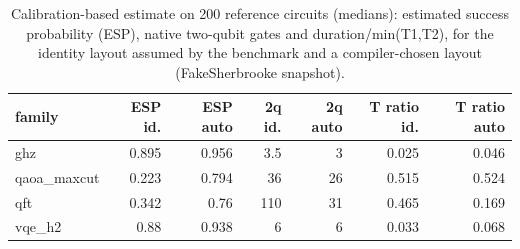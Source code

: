 \begin{table}[t]
\centering
\caption{Calibration-based estimate on 200 reference circuits (medians): estimated success probability (ESP), native two-qubit gates and duration/min(T1,T2), for the identity layout assumed by the benchmark and a compiler-chosen layout (FakeSherbrooke snapshot).}
\label{tab:hardware}
\footnotesize
\setlength{\tabcolsep}{3pt}
\begin{tabular}{lrrrrrr}
\toprule
family & ESP id. & ESP auto & 2q id. & 2q auto & T ratio id. & T ratio auto \\
\midrule
ghz & 0.895 & 0.956 & 3.5 & 3 & 0.025 & 0.046 \\
qaoa\_maxcut & 0.223 & 0.794 & 36 & 26 & 0.515 & 0.524 \\
qft & 0.342 & 0.76 & 110 & 31 & 0.465 & 0.169 \\
vqe\_h2 & 0.88 & 0.938 & 6 & 6 & 0.033 & 0.068 \\
\bottomrule
\end{tabular}
\end{table}
